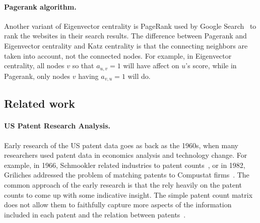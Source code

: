 \paragraph{Pagerank algorithm.}  Another variant of Eigenvector centrality is
PageRank used by Google Search~\cite{pagerank-wiki} to rank the websites in
their search results. The difference between Pagerank and Eigenvector
centrality and Katz centrality is that the connecting neighbors are taken into
account, not the connected nodes. For example, in Eigenvector centrality, all
nodes $v$ so that $a_{u, v}= 1$ will have affect on $u$'s score, while in
Pagerank, only nodes $v$ having $a_{v, u} = 1$ will do.


\subsection{Related work}
\paragraph{US Patent Research Analysis.} Early research of the US patent data goes
as back as the 1960s, when many researchers used patent data in economics
analysis and technology change. For example, in 1966,  Schmookler related 
industries to patent counts~\cite{Schmookler1966}, or in 1982, Griliches
addressed the problem of matching patents to Compustat
firms~\cite{Griliches1982}. The common approach of the early research is that
the rely heavily on the patent counts to come up with some indicative insight.
The simple patent count matrix does not allow them to faithfully capture more
aspects of the information included in each patent and the relation between
patents~\cite{Griliches1987}.


